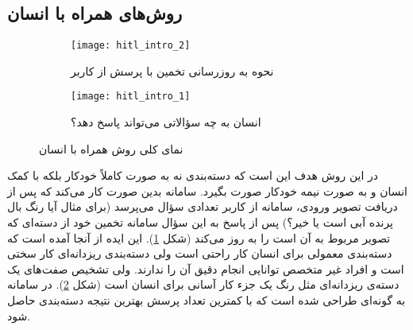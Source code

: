 \documentclass[11pt]{article}
\begin{document}

\subsection{روش‌های همراه با انسان}\label{sec:fg_class:hil}
\begin{figure}[t!]
	\centering
	\begin{subfigure}[h]{0.6\textwidth}
		\centering
		\texttt{[image: hitl\_intro\_2]}
		\caption{نحوه به روزرسانی تخمین با پرسش از کاربر}
		\label{fig:fg_class:hil:up}
	\end{subfigure}
	\begin{subfigure}[h]{0.6\textwidth}
		\centering
		\texttt{[image: hitl\_intro\_1]}
		\caption{انسان به چه سؤالاتی می‌تواند پاسخ دهد؟}
		\label{fig:fg_class:hil:int}
	\end{subfigure}
	\caption{نمای کلی روش همراه با انسان}
	\label{fig:fg_class:hil}
\end{figure}

در این روش هدف این است که دسته‌بندی نه به صورت کاملاً خودکار بلکه با کمک انسان و به صورت نیمه خودکار صورت بگیرد. سامانه بدین صورت کار می‌کند که پس از دریافت تصویر ورودی، سامانه از کاربر تعدادی سؤال می‌پرسد (برای مثال آیا رنگ بال پرنده آبی است یا خیر؟) پس از پاسخ به این سؤال سامانه تخمین خود از دسته‌ای که تصویر مربوط به آن است را به روز می‌کند (شکل
\ref{fig:fg_class:hil:up}).
این ایده از آنجا آمده است که دسته‌بندی معمولی برای انسان کار راحتی است ولی دسته‌بندی ریزدانه‌ای کار سختی است و افراد غیر متخصص توانایی انجام دقیق آن را ندارند. ولی تشخیص صفت‌های یک دسته‌ی ریزدانه‌ای مثل رنگ یک جزء کار آسانی برای انسان است (شکل
\ref{fig:fg_class:hil:int}). 
در
\cite{branson2010}
سامانه به گونه‌ای طراحی شده است که با کمترین تعداد پرسش بهترین نتیجه دسته‌بندی حاصل شود.
\end{document}
